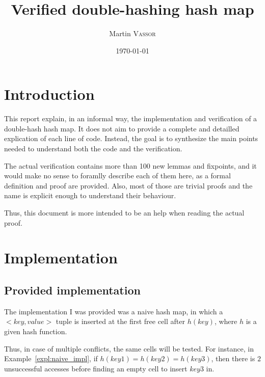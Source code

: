 \documentclass[oneside]{article}
\title{Verified double-hashing hash map}
\author{Martin \textsc{Vassor}}
\date{\today}
\begin{document}
\maketitle

\section{Introduction}
This report explain, in an informal way, the implementation and verification of a double-hash hash map. It does not aim to provide a complete and detailled explication of each line of code. Instead, the goal is to synthesize the main points needed to understand both the code and the verification.

The actual verification contains more than 100 new lemmas and fixpoints, and it would make no sense to foramlly describe each of them here, as a formal definition and proof are provided. Also, most of those are trivial proofs and the name is explicit enough to understand their behaviour.

Thus, this document is more intended to be an help when reading the actual proof.


\section{Implementation}
\subsection{Provided implementation}
The implementation I was provided was a naive hash map, in which a $<key, value>$ tuple is inserted at the first free cell after $h(key)$, where $h$ is a given hash function.

Thus, in case of multiple conflicts, the same cells will be tested. For instance, in Example~\ref{expl:naive_impl}, if $h(key1) = h(key2) = h(key3)$, then there is $2$ unsuccessful accesses before finding an empty cell to insert $key3$ in.
\end{document}
